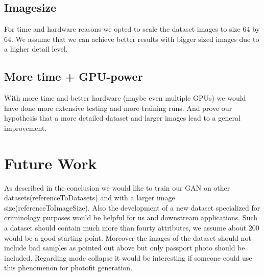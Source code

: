 \documentclass[12pt, a4paper]{article}
\begin{document}
\subsection{Imagesize}
For time and hardware reasons we opted to scale the dataset images to size 64 by 64. We assume that we can achieve better results with bigger sized images due to a higher detail level.

\subsection{More time + GPU-power}
With more time and better hardware (maybe even multiple GPUs) we would have done more extensive testing and more training runs. And prove our hypothesis that a more detailed dataset and larger images lead to a general improvement.

\section{Future Work}
As described in the conclusion we would like to train our GAN on other datasets(referenceToDatasets) and with a larger image size(referenceToImageSize). 
Also the development of a new dataset specialized for criminology purposes would be helpful for us and downstream applications.
Such a dataset should contain much more than fourty attributes, we assume about 200 would be a good starting point. Moreover the images of the dataset should not include bad samples as pointed out above but only passport photo should be included.
Regarding mode collapse it would be interesting if someone could use this phenomenon for photofit generation.
\end{document}
